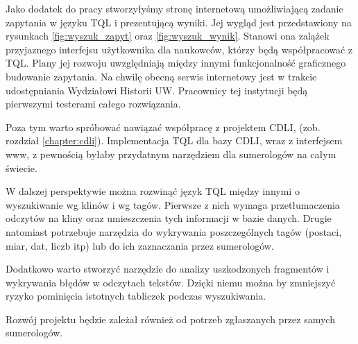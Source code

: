 Jako dodatek do pracy stworzyłyśmy stronę internetową umożliwiającą zadanie zapytania w języku TQL i prezentującą wyniki. 
Jej wygląd jest przedstawiony na rysunkach \ref{fig:wyszuk_zapyt} oraz \ref{fig:wyszuk_wynik}.
Stanowi ona zalążek przyjaznego interfejsu użytkownika dla naukowców, którzy będą współpracować z TQL. Plany jej rozwoju
uwzględniają między innymi funkcjonalność graficznego budowanie zapytania.
Na chwilę obecną serwis internetowy jest w trakcie udostępniania Wydziałowi Historii UW.
Pracownicy tej instytucji będą pierwszymi testerami całego rozwiązania.

Poza tym warto spróbować nawiązać współpracę z projektem CDLI, (zob. rozdział \ref{chapter:cdli}).
Implementacja TQL dla bazy CDLI, wraz z interfejsem www, z pewnością byłaby przydatnym narzędziem dla sumerologów na całym świecie.

W dalszej perspektywie można rozwinąć język TQL między innymi o wyszukiwanie wg klinów i wg tagów. 
Pierwsze z nich wymaga przetłumaczenia odczytów na kliny oraz umieszczenia tych informacji w bazie danych.
Drugie natomiast potrzebuje narzędzia do wykrywania poszczególnych tagów
(postaci, miar, dat, liczb itp) lub do ich zaznaczania przez sumerologów.

Dodatkowo warto stworzyć narzędzie do analizy uszkodzonych fragmentów i wykrywania błędów w odczytach tekstów. 
Dzięki niemu można by zmniejszyć ryzyko pominięcia istotnych tabliczek podczas wyszukiwania. 

Rozwój projektu będzie zależał również od potrzeb zgłaszanych przez samych sumerologów.
